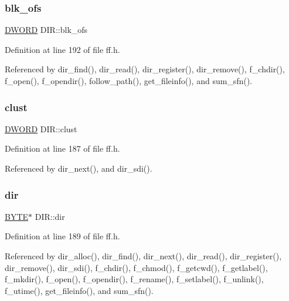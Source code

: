 \subsubsection{\texorpdfstring{blk\+\_\+ofs}{blk\_ofs}}
{\footnotesize\ttfamily \hyperlink{integer_8h_ad342ac907eb044443153a22f964bf0af}{D\+W\+O\+RD} D\+I\+R\+::blk\+\_\+ofs}



Definition at line 192 of file ff.\+h.



Referenced by dir\+\_\+find(), dir\+\_\+read(), dir\+\_\+register(), dir\+\_\+remove(), f\+\_\+chdir(), f\+\_\+open(), f\+\_\+opendir(), follow\+\_\+path(), get\+\_\+fileinfo(), and sum\+\_\+sfn().

\mbox{\label{structDIR_acfbb8ba2d6e73b6f999ceffd1857c190}} 
\subsubsection{\texorpdfstring{clust}{clust}}
{\footnotesize\ttfamily \hyperlink{integer_8h_ad342ac907eb044443153a22f964bf0af}{D\+W\+O\+RD} D\+I\+R\+::clust}



Definition at line 187 of file ff.\+h.



Referenced by dir\+\_\+next(), and dir\+\_\+sdi().

\mbox{\label{structDIR_a6c2a8c0cf2d55ae99775e93a16593449}} 
\subsubsection{\texorpdfstring{dir}{dir}}
{\footnotesize\ttfamily \hyperlink{integer_8h_a4ae1dab0fb4b072a66584546209e7d58}{B\+Y\+TE}$\ast$ D\+I\+R\+::dir}



Definition at line 189 of file ff.\+h.



Referenced by dir\+\_\+alloc(), dir\+\_\+find(), dir\+\_\+next(), dir\+\_\+read(), dir\+\_\+register(), dir\+\_\+remove(), dir\+\_\+sdi(), f\+\_\+chdir(), f\+\_\+chmod(), f\+\_\+getcwd(), f\+\_\+getlabel(), f\+\_\+mkdir(), f\+\_\+open(), f\+\_\+opendir(), f\+\_\+rename(), f\+\_\+setlabel(), f\+\_\+unlink(), f\+\_\+utime(), get\+\_\+fileinfo(), and sum\+\_\+sfn().

